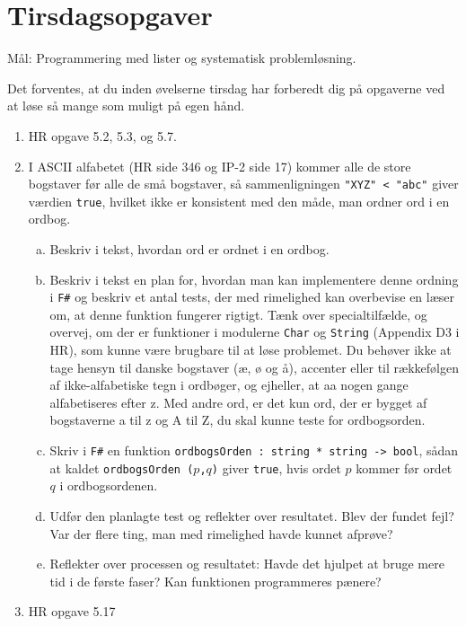 \documentclass[a4paper,12pt]{article}
\newcommand{\fs}{\texttt{F\#} }
\begin{document}
\section{Tirsdagsopgaver}
\label{sec:tirsdagsopgaver}

Mål: Programmering med lister og systematisk problemløsning.

Det forventes, at du inden øvelserne tirsdag har forberedt dig på
opgaverne ved at løse så mange som muligt på egen hånd.

\begin{enumerate}[{2}T1]
 \item HR opgave 5.2, 5.3, og 5.7.
 \item I ASCII alfabetet (HR side 346 og IP-2 side 17) kommer alle de
   store bogstaver før alle de små bogstaver, så sammenligningen
   \texttt{"XYZ"\,<\,"abc"} giver værdien \texttt{true}, hvilket ikke
   er konsistent med den måde, man ordner ord i en ordbog.

\begin{enumerate}[(a)]

   \item Beskriv i tekst, hvordan ord er ordnet i en ordbog.

   \item Beskriv i tekst en plan for, hvordan man kan implementere
     denne ordning i \fs og beskriv et antal tests, der med rimelighed
     kan overbevise en læser om, at denne funktion fungerer rigtigt.
     Tænk over specialtilfælde, og overvej, om der er funktioner i
     modulerne \texttt{Char} og \texttt{String} (Appendix D3 i HR),
     som kunne være brugbare til at løse problemet.  Du behøver ikke
     at tage hensyn til danske bogstaver (æ, ø og å), accenter eller
     til rækkefølgen af ikke-alfabetiske tegn i ordbøger, og ejheller,
     at aa nogen gange alfabetiseres efter z.  Med andre ord, er det
     kun ord, der er bygget af bogstaverne a til z og A til Z, du skal
     kunne teste for ordbogsorden.

   \item Skriv i \fs en funktion
     \texttt{ordbogsOrden\,:\,string\,*\,string\,->\,bool}, sådan at
     kaldet \texttt{ordbogsOrden ($p$,$q$)} giver \texttt{true}, hvis
     ordet $p$ kommer før ordet $q$ i ordbogsordenen.

   \item Udfør den planlagte test og reflekter over resultatet.  Blev
     der fundet fejl? Var der flere ting, man med rimelighed havde kunnet
     afprøve?

   \item Reflekter over processen og resultatet: Havde det hjulpet at
     bruge mere tid i de første faser?  Kan funktionen programmeres
     pænere?

  \end{enumerate}
\item HR opgave 5.17

\end{enumerate}
\end{document}
